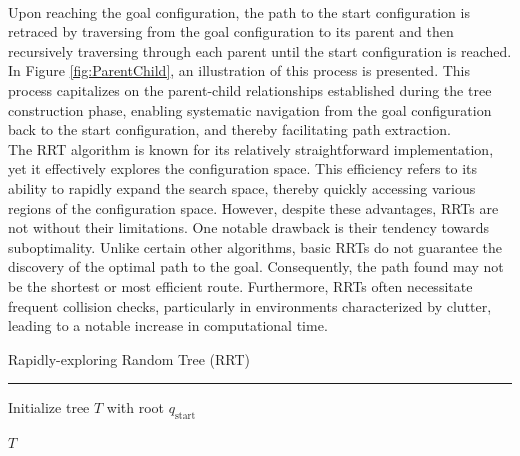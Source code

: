\documentclass{ctuthesis}
\begin{document}
\\
Upon reaching the goal configuration, 
the path to the start configuration is retraced by traversing from the goal configuration 
to its parent and then recursively traversing through each parent until 
the start configuration is reached. 
In Figure \ref{fig:ParentChild}, an illustration of this process is presented.
This process capitalizes on the parent-child relationships established during 
the tree construction phase, 
enabling systematic navigation from the goal configuration back to the start configuration, 
and thereby facilitating path extraction.\\[12pt]
The RRT algorithm is known for its relatively straightforward implementation, 
yet it effectively explores the configuration space. 
This efficiency refers to its ability to rapidly expand the search space, 
thereby quickly accessing various regions of the configuration space. 
However, despite these advantages, RRTs are not without their limitations. 
One notable drawback is their tendency towards suboptimality. 
Unlike certain other algorithms, basic RRTs do not guarantee the discovery of the optimal path to the goal. 
Consequently, the path found may not be the shortest or most efficient route. 
Furthermore, RRTs often necessitate frequent collision checks, 
particularly in environments characterized by clutter, 
leading to a notable increase in computational time.\\[12pt]
\begin{algorithm}[H]
  \caption{Rapidly-exploring Random Tree (RRT)}
  \label{alg:rrt} 
  \vspace{0.1cm}
  \hrule
  \vspace{0.2cm}
  Initialize tree $T$ with root $q_{\text{start}}$\;
  
  \Return $T$\;
\end{algorithm}
 
\end{document}

